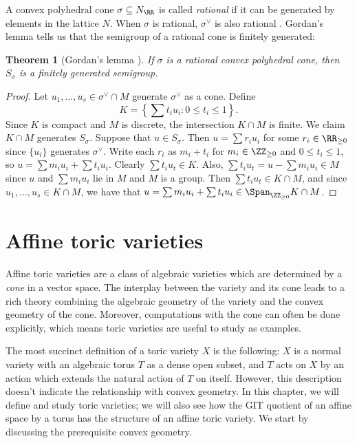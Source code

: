 \documentclass[12pt]{amsart}
\theoremstyle{plain}
\newtheorem{theorem}{Theorem}%
\begin{document}
A convex polyhedral cone $\sigma \subseteq N_\RR$ is called \emph{rational} if it can be generated by elements in the lattice $N$.
When $\sigma$ is rational, $\sigma^\vee$ is also rational \cite[\S 1.2]{Fulton93}.
Gordan's lemma tells us that the semigroup of a rational cone is finitely generated:

\begin{theorem}[Gordan's lemma {\cite[\S 1.2]{Fulton93}}]\label{gordanslemma}
If $\sigma$ is a rational convex polyhedral cone, then $S_\sigma$ is a finitely generated semigroup.
\end{theorem}
\begin{proof}
Let $u_1, \ldots, u_s \in \sigma^\vee \cap M$ generate $\sigma^\vee$ as a cone.
Define
$$K = \left\{\sum t_i u_i : 0 \le t_i \le 1\right\}.$$
Since $K$ is compact and $M$ is discrete, the intersection $K \cap M$ is finite.
We claim $K \cap M$ generates $S_\sigma$.
Suppose that $u \in S_\sigma$.
Then $u = \sum r_i u_i$ for some $r_i \in \RR_{\ge 0}$ since $\{u_i\}$ generates $\sigma^\vee$.
Write each $r_i$ as $m_i + t_i$ for $m_i \in \ZZ_{\ge 0}$ and $0 \le t_i \le 1$, so $u = \sum m_i u_i + \sum t_i u_i$.
Clearly $\sum t_i u_t \in K$.
Also, $\sum t_i u_t = u - \sum m_i u_i \in M$ since $u$ and $\sum m_i u_i$ lie in $M$ and $M$ is a group.
Then $\sum t_i u_t \in K \cap M$, and since $u_1, \ldots, u_s \in K \cap M$, we have that $u = \sum m_i u_i + \sum t_i u_i \in \Span_{\ZZ_{\ge 0}} K \cap M$.
\end{proof}

\newpage
\section{Affine toric varieties}\label{affinetoricvarieties}
Affine toric varieties are a class of algebraic varieties which are determined by a \emph{cone} in a vector space.
The interplay between the variety and its cone leads to a rich theory combining the algebraic geometry of the variety and the convex geometry of the cone.
Moreover, computations with the cone can often be done explicitly, which means toric varieties are useful to study as examples.

The most succinct definition of a toric variety $X$ is the following:
$X$ is a normal variety with an algebraic torus $T$ as a dense open subset, and $T$ acts on $X$ by an action which extends the natural action of $T$ on itself.
However, this description doesn't indicate the relationship with convex geometry.
In this chapter, we will define and study toric varieties; we will also see how the GIT quotient of an affine space by a torus has the structure of an affine toric variety.
We start by discussing the prerequisite convex geometry.
\end{document}
